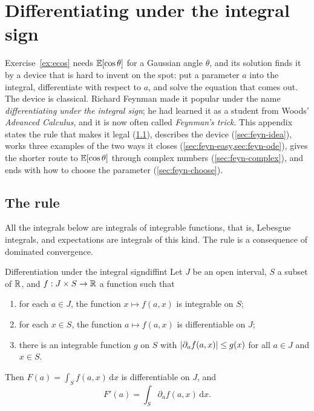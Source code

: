 \chapter{Differentiating under the integral sign}
\label{app:feynman}

Exercise~\ref{ex:ecos} needs $\mathbb{E}[\cos\theta]$ for a Gaussian angle
$\theta$, and its solution finds it by a device that is hard to invent
on the spot: put a parameter $a$ into the integral, differentiate with
respect to $a$, and solve the equation that comes out. The device is
classical. Richard Feynman made it popular under the name
\emph{differentiating under the integral sign}; he had learned it as a
student from Woods' \emph{Advanced Calculus}, and it is now often called
\emph{Feynman's trick}. This appendix states the rule that makes it legal
(\cref{sec:feyn-rule}), describes the device (\cref{sec:feyn-idea}),
works three examples of the two ways it closes
(\cref{sec:feyn-easy,sec:feyn-ode}), gives the shorter route to
$\mathbb{E}[\cos\theta]$ through complex numbers (\cref{sec:feyn-complex}), and
ends with how to choose the parameter (\cref{sec:feyn-choose}).

\section{The rule}
\label{sec:feyn-rule}

All the integrals below are integrals of integrable functions, that is,
Lebesgue integrals, and expectations are integrals of this kind. The
rule is a consequence of dominated convergence.

\begin{proposition}{Differentiation under the integral sign}{diffint}
Let $J$ be an open interval, $S$ a subset of $\mathbb{R}$, and
$f:J\times S\to\mathbb{R}$ a function such that
\begin{enumerate}[nosep]
  \item for each $a\in J$, the function $x\mapsto f(a,x)$ is integrable
        on $S$;
  \item for each $x\in S$, the function $a\mapsto f(a,x)$ is
        differentiable on $J$;
  \item there is an integrable function $g$ on $S$ with
        $\left\lvert \partial_af(a,x)\right\rvert\le g(x)$ for all $a\in J$ and $x\in S$.
\end{enumerate}
Then $F(a)=\int_Sf(a,x)\,\mathrm dx$ is differentiable on $J$, and
\[
  F'(a)=\int_S\partial_af(a,x)\,\mathrm dx .
\]
\end{proposition}

